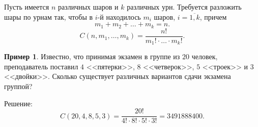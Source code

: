 \documentclass[a5paper, 11pt]{extarticle}
\theoremstyle{definition}
\newtheorem{example}{Пример}[subsection]
\theoremstyle{definition}
\theoremstyle{definition}
\numberwithin{figure}{section}
\numberwithin{table}{section}
\begin{document}
Пусть имеется \(n\) различных шаров и \(k\) различных урн. Требуется разложить шары по урнам так, чтобы в \(i\)-й находилось \(m_i\) шаров, \(i = \overline{1, k}\), причем
\[
    m_1 + m_2 + \ldots + m_k = n.
\]
\[
    C(n, m_1, \ldots, m_k) = \frac{n!}{m_1! \cdot \ldots \cdot m_k!}.
\]

\begin{example}
    Известно, что принимая экзамен в группе из \(20\) человек, преподаватель поставил \(4\) <<пятерки>>, \(8\) <<четверок>>, \(5\) <<троек>> и \(3\) <<двойки>>. Сколько существует различных вариантов сдачи экзамена группой?

    Решение:
    \[
        C(20, 4, 8, 5, 3) = \frac{20!}{4! \cdot 8! \cdot 5! \cdot 3!} = 3491888400.
    \]
\end{example}
\end{document}
